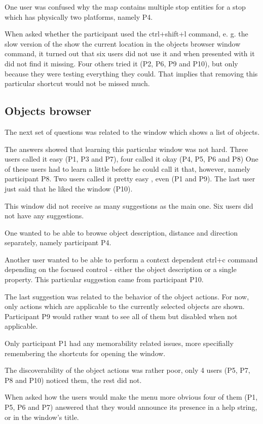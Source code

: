 \documentclass[nolof,digital]{fithesis3}
\begin{document}
One  user was confused why the map contains multiple stop entities for a stop which has physically two platforms, namely P4.

When asked whether the participant used the ctrl+shift+l command, e. g. the slow version of the show the current location in the objects browser window command, it turned out that six users did not use it and when presented with it did not find it missing. Four others tried it (P2, P6, P9 and P10), but only because they were testing everything they could. That implies that removing this particular shortcut would not be missed much.
\subsection{Objects browser}
The next set of questions was related to the window which shows a list of objects.

The answers showed that learning this particular window was not hard. Three users called it easy (P1, P3 and P7), four called it okay (P4, P5, P6 and P8) One of these users had to learn a little before he could call it that, however, namely participant P8. Two users called it pretty easy , even (P1 and P9). The last user just said that he liked the window (P10).

This window did not receive as many suggestions as the main one. Six users did not have any suggestions.

One wanted to be able to browse object description, distance and direction separately, namely participant P4.

Another user wanted to be able to perform a context dependent ctrl+c command depending on the focused control - either the object description or a single property. This particular suggestion came from participant P10.

The last suggestion was related to the behavior of the object actions. For now, only actions which are applicable to the currently selected objects are shown. Participant P9 would rather want to see all of them but disabled when not applicable.

Only participant P1 had any memorability related issues, more specifially remembering the shortcuts for opening the window.

The discoverability of the object actions was rather poor, only 4 users (P5, P7, P8 and P10) noticed them, the rest did not.

When asked how the users would make the menu more obvious four of them (P1, P5, P6 and P7) answered that they would announce its presence in a help string, or in the window's title.
\end{document}
